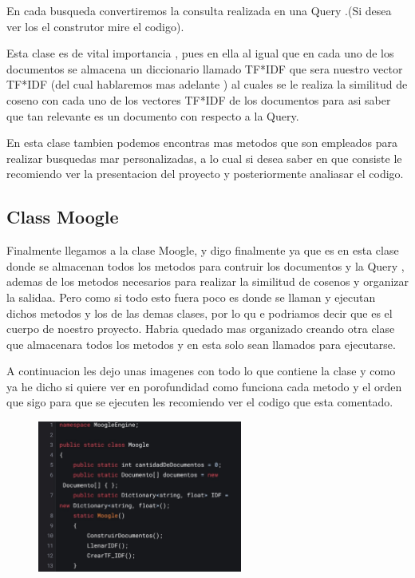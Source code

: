 \documentclass[a4paper,12pt]{article}
\begin{document}
En cada busqueda convertiremos la consulta realizada en una Query .(Si desea ver los el construtor mire el codigo).

Esta clase es de vital importancia , pues en ella al igual que en cada uno de los documentos se almacena un diccionario llamado TF*IDF
que sera nuestro vector TF*IDF (del cual hablaremos mas adelante ) al cuales se le realiza la similitud de coseno con cada uno de los 
vectores TF*IDF de los documentos para asi saber que tan relevante es un documento con respecto a la Query.

En esta clase tambien podemos encontras mas metodos que son empleados para realizar busquedas mar personalizadas, a lo cual si desea saber 
en que consiste le recomiendo ver la presentacion del proyecto y posteriormente analiasar el codigo.

\subsection{Class Moogle}\label{sub:Moogle}

 Finalmente llegamos a la clase Moogle, y digo finalmente ya que es en esta clase donde se almacenan todos los metodos para contruir los documentos
 y la Query , ademas de los metodos necesarios para realizar la similitud de cosenos y organizar la salidaa.
 Pero como si todo esto fuera poco es donde se llaman y  ejecutan dichos metodos y los de las demas clases, por lo qu
 e podriamos decir que es el cuerpo
 de noestro proyecto.
 Habria quedado mas organizado creando otra clase que almacenara todos los metodos y en esta solo sean llamados para ejecutarse.

 A continuacion les dejo unas imagenes con todo lo que contiene la clase y como ya he dicho si quiere ver en porofundidad como funciona cada metodo 
 y el orden que sigo para que se ejecuten les recomiendo ver el codigo que esta comentado.

 \begin{figure}[H]
    \centering
    \includegraphics[width=0.6\textwidth]{imagenes/7.mo.jpg}
\end{figure}
\end{document}
